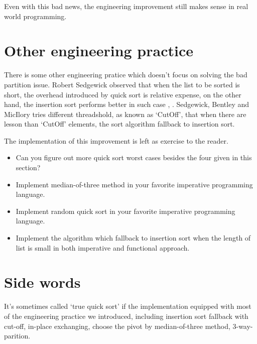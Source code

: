 \documentclass{article}
\begin{document}
Even with this bad news, the engineering improvement still makes sense in real world programming.

\section{Other engineering practice}
There is some other engineering pratice which doesn't focus on solving the bad partition issue.
Robert Sedgewick observed that when the list to be sorted is short, the overhead introduced by
quick sort is relative expense, on the other hand, the insertion sort performs better in such
case \cite{pearls}, \cite{3-way-part}. Sedgewick, Bentley and MicIlory tries different
threadshold, as known as `CutOff', that when 
there are lesson than `CutOff' elements, the sort algorithm fallback to insertion sort.

\begin{algorithmic}
    \State {}
  \Else
    \State {}
  \EndIf
\EndProcedure
\end{algorithmic}

The implementation of this improvement is left as exercise to the reader.

\begin{Exercise}
\begin{itemize}
\item Can you figure out more quick sort worst cases besides the four given in this section?
\item Implement median-of-three method in your favorite imperative programming language.
\item Implement random quick sort in your favorite imperative programming language.
\item Implement the algorithm which fallback to insertion sort when the length of list is
small in both imperative and functional approach.
\end{itemize}
\end{Exercise}

\section{Side words}
It's sometimes called `true quick sort' if the implementation equipped with most of
the engineering practice we introduced, including insertion sort fallback with cut-off,
in-place exchanging, choose the pivot by median-of-three method, 3-way-parition.
\end{document}
